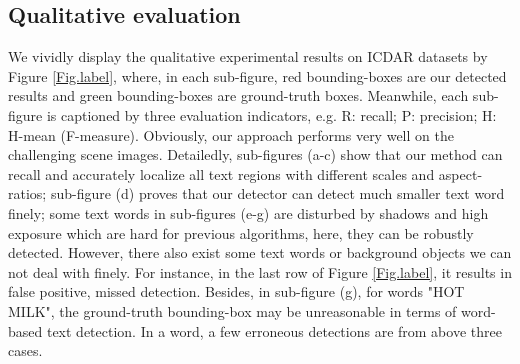 \documentclass[letterpaper]{article}
\begin{document}
\subsection{Qualitative evaluation}
We vividly display the qualitative experimental results on ICDAR datasets by Figure \ref{Fig.label}, where, in each  sub-figure, red bounding-boxes are our detected results and green bounding-boxes are ground-truth boxes. Meanwhile, each sub-figure is captioned by three evaluation indicators, e.g. R: recall; P: precision; H: H-mean (F-measure). Obviously, our approach performs very well on the challenging scene images. Detailedly, sub-figures (a-c) show that our method can recall and accurately localize all text regions with different scales and aspect-ratios; sub-figure (d) proves that our detector can detect much smaller text word finely; some text words in sub-figures (e-g) are disturbed by shadows and high exposure which are hard for previous algorithms, here, they can be robustly detected. However, there also exist some text words  or background objects we can not deal with finely. For instance, in the last row of Figure \ref{Fig.label}, it results in false positive, missed detection. Besides, in sub-figure (g), for words "HOT MILK", the ground-truth bounding-box may be unreasonable in terms of word-based text detection. In a word, a few erroneous detections are from above three cases.  
\end{document}
